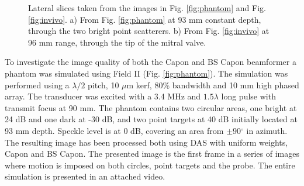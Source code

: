 \documentclass[journal]{IEEEtran}
\newcommand{\degree}{\ensuremath{^\circ}}
\begin{document}
\begin{figure}[!t]
\centerline{
\hfil
{}
}
\caption{Lateral slices taken from the images in Fig. \ref{fig:phantom} and Fig. \ref{fig:invivo}. a) From Fig. \ref{fig:phantom} at 93 mm constant depth, through the two bright point scatterers. b) From Fig. \ref{fig:invivo} at 96 mm range, through the tip of the mitral valve.}
\label{fig:slices}
\end{figure}

To investigate the image quality of both the Capon and BS Capon beamformer a phantom was simulated using Field II \cite{Jensen1992} (Fig. \ref{fig:phantom}). The simulation was performed using a $\lambda/2$ pitch, 10 $\mu$m kerf, 80\% bandwidth and 10 mm high phased array. The transducer was excited with a 3.4 MHz and $1.5\lambda$ long pulse with transmit focus at 90 mm. The phantom contains two circular areas, one bright at 24 dB and one dark at -30 dB, and two point targets at 40 dB initially located at 93 mm depth. Speckle level is at 0 dB, covering an area from $\pm90\degree$ in azimuth. The resulting image has been processed both using DAS with uniform weights, Capon and BS Capon. The presented image is the first frame in a series of images where motion is imposed on both circles, point targets and the probe. The entire simulation is presented in an attached video.
\end{document}
